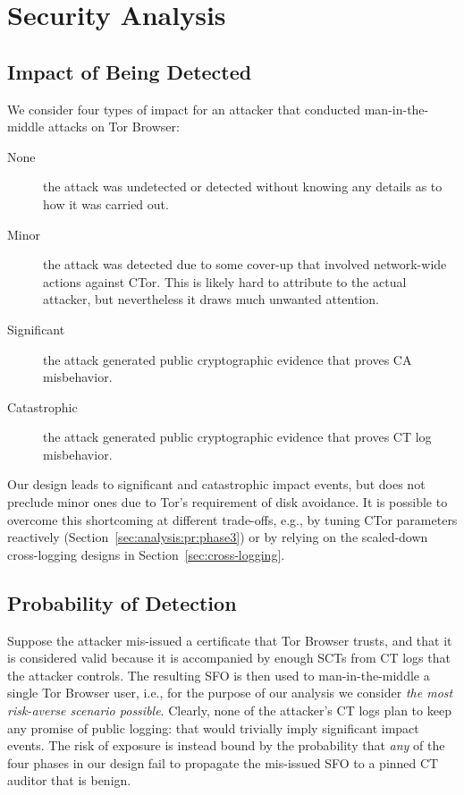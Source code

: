 \section{Security Analysis} \label{sec:analysis}

\subsection{Impact of Being Detected} \label{sec:analysis:impact}
We consider four types of impact for an attacker that conducted
man-in-the-middle attacks on Tor Browser:
\begin{description}
	\item[None] the attack was undetected or detected without knowing any
		details as to how it was carried out.
	\item[Minor] the attack was detected due to some cover-up that involved
		network-wide actions against CTor.  This is likely hard to attribute to
		the actual attacker, but nevertheless it draws much unwanted attention.
	\item[Significant] the attack generated public cryptographic evidence
		that proves CA misbehavior.
	\item[Catastrophic] the attack generated public cryptographic evidence
		that proves CT log misbehavior.
\end{description}

Our design leads to significant and catastrophic impact events, but does
not preclude minor ones due to Tor's requirement of disk avoidance.  It is
possible to overcome this shortcoming at different trade-offs, e.g., by
tuning CTor parameters reactively (Section~\ref{sec:analysis:pr:phase3}) or by
relying on the scaled-down cross-logging designs in
Section~\ref{sec:cross-logging}.

\subsection{Probability of Detection} \label{sec:analysis:pr}
Suppose the attacker mis-issued a certificate that Tor Browser trusts, and that
it is considered valid because it is accompanied by enough SCTs from CT logs
that the attacker controls.  The resulting SFO is then used to man-in-the-middle
a single Tor Browser user, i.e., for the purpose of our analysis we consider
\emph{the most risk-averse scenario possible}.  Clearly, none of the attacker's
CT logs plan to keep any promise of public logging:
	that would trivially imply significant impact events.
The risk of exposure is instead bound by the probability that \emph{any} of the
four phases in our design fail to propagate the mis-issued SFO to a pinned CT
auditor that is benign.


